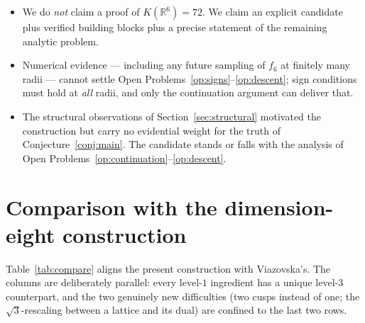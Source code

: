 \documentclass[11pt,reqno]{amsart}
\theoremstyle{plain}
\theoremstyle{definition}
\theoremstyle{remark}
\newcommand{\R}{\mathbb{R}}
\begin{document}
\begin{itemize}
\item We do \emph{not} claim a proof of $K(\R^6)=72$.  We claim an
explicit candidate plus verified building blocks plus a precise
statement of the remaining analytic problem.
\item Numerical evidence --- including any future sampling of $f_6$
at finitely many radii --- cannot settle
Open Problems~\ref{op:signs}--\ref{op:descent}; sign conditions must
hold at \emph{all} radii, and only the continuation argument can
deliver that.
\item The structural observations of Section~\ref{sec:structural}
motivated the construction but carry no evidential weight for the
truth of Conjecture~\ref{conj:main}.  The candidate stands or falls
with the analysis of Open
Problems~\ref{op:continuation}--\ref{op:descent}.
\end{itemize}

\section{Comparison with the dimension-eight construction}
\label{sec:comparison}

Table~\ref{tab:compare} aligns the present construction with
Viazovska's.  The columns are deliberately parallel: every level-$1$
ingredient has a unique level-$3$ counterpart, and the two genuinely
new difficulties (two cusps instead of one; the $\sqrt3$-rescaling
between a lattice and its dual) are confined to the last two rows.
\end{document}
